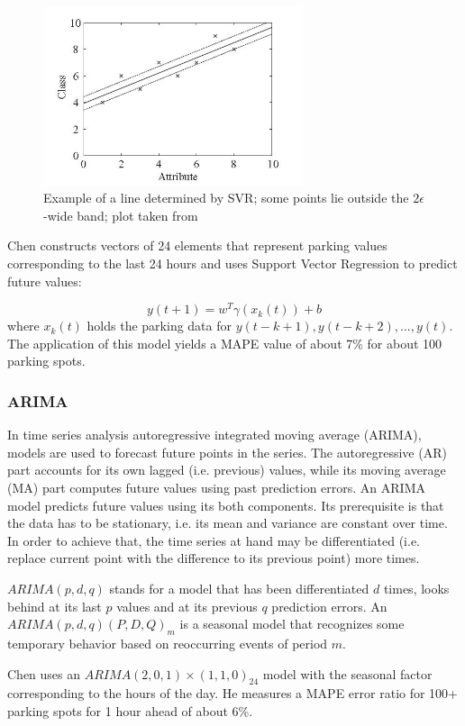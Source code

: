 \documentclass{article}
\begin{document}
\begin{figure}[!ht]
    \centering
    \includegraphics[width=3.0in]{svr}
    \caption{Example of a line determined by SVR; some points lie outside the $2\epsilon$-wide band; plot taken from \cite{Witten} }
    \label{fig:svr}
\end{figure}

\vspace{2mm}
Chen\cite{Chen} constructs vectors of 24 elements that represent parking values corresponding to the last 24 hours and uses Support Vector Regression to predict future values:

$$y(t+1) = w^T\gamma(x_k(t)) + b$$
where $x_k(t)$ holds the parking data for $y(t-k+1), y(t-k+2), ..., y(t)$. The application of this model yields a MAPE value of about 7\% for about 100 parking spots.

\subsubsection{ARIMA}
In time series analysis autoregressive integrated moving average (ARIMA), models are used to forecast future points in the series. The autoregressive (AR) part accounts for its own lagged (i.e. previous) values, while its moving average (MA) part computes future values using past prediction errors. An ARIMA model predicts future values using its both components. Its prerequisite is that the data has to be stationary, i.e. its mean and variance are constant over time. In order to achieve that, the time series at hand may be differentiated (i.e. replace current point with the difference to its previous point) more times.

$ARIMA(p,d,q)$ stands for a model that has been differentiated $d$ times, looks behind at its last $p$ values and at its previous $q$ prediction errors. An $ARIMA(p,d,q)(P,D,Q)_m$ is a seasonal model that recognizes some temporary behavior based on reoccurring events of period $m$.

\vspace{2mm}
Chen\cite{Chen} uses an $ARIMA(2,0,1) \times (1,1,0)_{24}$ model with the seasonal factor corresponding to the hours of the day. He measures a MAPE error ratio for 100+ parking spots for 1 hour ahead of about 6\%.
\end{document}
